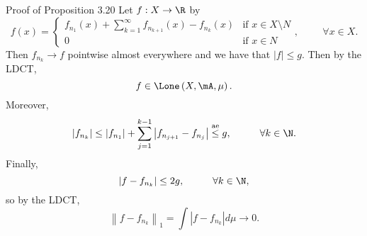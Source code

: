 \documentclass[pmath451]{subfiles}
\begin{document}
\begin{boxyproof}{Proof of Proposition 3.20}
        Let $f:X\to\R$ by
        \begin{equation*}
            f\left( x \right) = 
            \begin{cases} 
                f_{n_1}\left( x \right) + \sum^{\infty}_{k=1} f_{n_{k+1}}\left( x \right)-f_{n_k}\left( x \right) & \text{if $x\in X\setminus N$} \\
                0 & \text{if $x\in N$}
            \end{cases} ,\hspace{1cm}\forall x\in X.
        \end{equation*}
        Then $f_{n_k}\to f$ pointwise almost everywhere and we have that $\left| f \right|\leq g$. Then by the LDCT,
        \begin{equation*}
            f\in\Lone\left( X,\mA,\mu \right).
        \end{equation*}
        Moreover,
        \begin{equation*}
            \left| f_{n_k} \right| \leq \left| f_{n_1} \right| + \sum^{k-1}_{j=1} \left| f_{n_{j+1}}-f_{n_j} \right| \overset{\text{ae}}{\leq} g, \hspace{1cm}\forall k\in\N.
        \end{equation*}
        Finally,
        \begin{equation*}
            \left| f-f_{n_k} \right|\leq 2g, \hspace{1cm}\forall k\in\N,
        \end{equation*}
        so by the LDCT,
        \begin{equation*}
            \left\lVert f-f_{n_k} \right\rVert_{1} = \int\left| f-f_{n_k} \right|d\mu \to 0.
        \end{equation*}
    \end{boxyproof}
    
    
    
    
    
    
    
    
    
    
    
    
    
    
    
    
    
    
    
    
    
    
    
    
    
    
    
\end{document}
